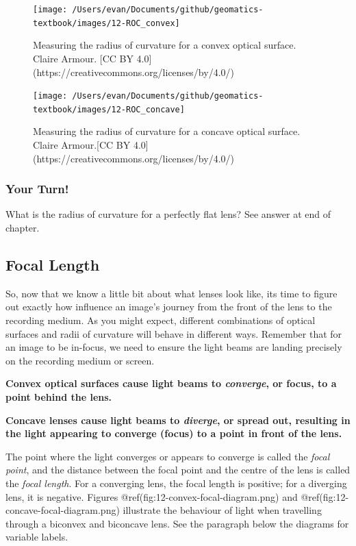 \documentclass[
]{book}
\begin{document}
\begin{figure}
\texttt{[image: /Users/evan/Documents/github/geomatics-textbook/images/12-ROC\_convex]} \caption{Measuring the radius of curvature for a convex optical surface. Claire Armour. [CC BY 4.0](https://creativecommons.org/licenses/by/4.0/)}\label{fig:12-RoC-convex}
\end{figure}

\begin{figure}
\texttt{[image: /Users/evan/Documents/github/geomatics-textbook/images/12-ROC\_concave]} \caption{Measuring the radius of curvature for a concave optical surface. Claire Armour.[CC BY 4.0](https://creativecommons.org/licenses/by/4.0/)}\label{fig:12-RoC-concave}
\end{figure}

\hypertarget{your-turn-6}{%
\subsubsection*{Your Turn!}\label{your-turn-6}}

What is the radius of curvature for a perfectly flat lens? See answer at end of chapter.

\hypertarget{focal-length}{%
\subsection{Focal Length}\label{focal-length}}

So, now that we know a little bit about what lenses look like, its time to figure out exactly how influence an image's journey from the front of the lens to the recording medium. As you might expect, different combinations of optical surfaces and radii of curvature will behave in different ways. Remember that for an image to be in-focus, we need to ensure the light beams are landing precisely on the recording medium or screen.

\textbf{Convex optical surfaces cause light beams to \emph{converge}, or focus, to a point behind the lens.}

\textbf{Concave lenses cause light beams to \emph{diverge}, or spread out, resulting in the light appearing to converge (focus) to a point in front of the lens.}

The point where the light converges or appears to converge is called the \emph{focal point}, and the distance between the focal point and the centre of the lens is called the \emph{focal length}. For a converging lens, the focal length is positive; for a diverging lens, it is negative. Figures @ref(fig:12-convex-focal-diagram.png) and @ref(fig:12-concave-focal-diagram.png) illustrate the behaviour of light when travelling through a biconvex and biconcave lens. See the paragraph below the diagrams for variable labels.
\end{document}
